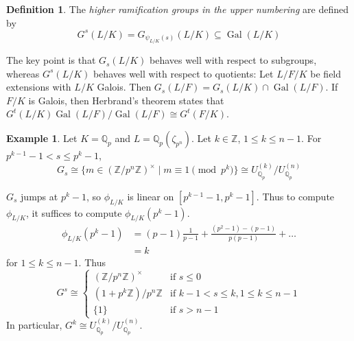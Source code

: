 \documentclass[11pt]{article}
\theoremstyle{definition}
\newtheorem{definition}{Definition}[subsection]
\newtheorem*{example}{Example}
\theoremstyle{plain}
\theoremstyle{remark}
\DeclareMathOperator{\Gal}{Gal}
\newcommand{\ZZ}{\mathbb{Z}}
\newcommand{\QQ}{\mathbb{Q}}
\begin{document}
\begin{definition}\label{def:21_1}
    The \emph{higher ramification groups in the upper numbering} are defined by
    \begin{equation*}
        G^s(L/K) = G_{\psi_{L/K}(s)}(L/K) \subseteq \Gal(L/K)
    \end{equation*}
\end{definition}

The key point is that $G_s(L/K)$ behaves well with respect to subgroups, whereas $G^s(L/K)$ behaves well with respect to quotients: Let $L/F/K$ be field extensions with $L/K$ Galois. Then $G_s(L/F) = G_s(L/K) \cap \Gal(L/F)$. If $F/K$ is Galois, then Herbrand's theorem states that $G^t(L/K) \Gal(L/F) / \Gal(L/F) \cong G^t(F/K)$.

\begin{example}
    Let $K = \QQ_p$ and $L = \QQ_p(\zeta_{p^n})$. Let $k \in \ZZ$, $1 \le k \le n-1$. For $p^{k-1} - 1 < s \le p^k - 1$,
    \begin{equation*}
        G_s \cong \{m \in (\ZZ / p^n \ZZ)^\times \mid m \equiv 1 \pmod{p^k}\} \cong U_{\QQ_p}^{(k)} / U_{\QQ_p}^{(n)}
    \end{equation*}
\end{example}
$G_s$ jumps at $p^k - 1$, so $\phi_{L/K}$ is linear on $[p^{k-1} - 1, p^k - 1]$. Thus to compute $\phi_{L/K}$, it suffices to compute $\phi_{L/K}(p^k-1)$.
\begin{align*}
    \phi_{L/K}(p^k-1)
    &= (p-1) \frac{1}{p-1} + \frac{(p^2 - 1) - (p - 1)}{p(p-1)} + \ldots\\
    &= k
\end{align*}
for $1 \le k \le n-1$. Thus
\begin{equation*}
    G^s \cong
    \begin{cases}
        (\ZZ / p^n \ZZ)^\times & \text{if } s \le 0\\
        (1 + p^k \ZZ) / p^n \ZZ & \text{if } k-1 < s \le k, 1 \le k \le n - 1\\
        \{1\} & \text{if } s > n-1
    \end{cases}
\end{equation*}
In particular, $G^k \cong U_{\QQ_p}^{(k)} / U_{\QQ_p}^{(n)}$.
\end{document}

